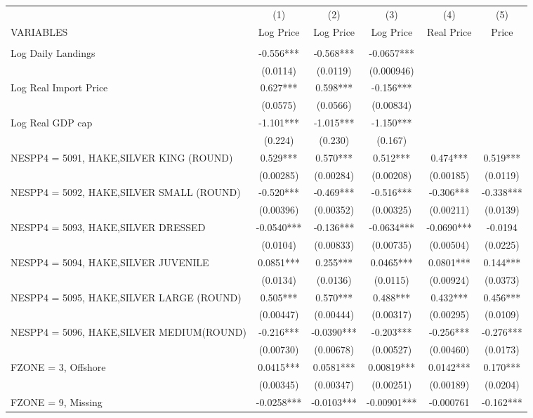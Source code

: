 \begin{tabular}{lccccc} \hline
 & (1) & (2) & (3) & (4) & (5) \\
VARIABLES & Log Price & Log Price & Log Price & Real Price & Price \\ \hline
 &  &  &  &  &  \\
Log Daily Landings & -0.556*** & -0.568*** & -0.0657*** &  &  \\
 & (0.0114) & (0.0119) & (0.000946) &  &  \\
Log Real Import Price & 0.627*** & 0.598*** & -0.156*** &  &  \\
 & (0.0575) & (0.0566) & (0.00834) &  &  \\
Log Real GDP cap & -1.101*** & -1.015*** & -1.150*** &  &  \\
 & (0.224) & (0.230) & (0.167) &  &  \\
NESPP4 = 5091, HAKE,SILVER KING (ROUND) & 0.529*** & 0.570*** & 0.512*** & 0.474*** & 0.519*** \\
 & (0.00285) & (0.00284) & (0.00208) & (0.00185) & (0.0119) \\
NESPP4 = 5092, HAKE,SILVER SMALL (ROUND) & -0.520*** & -0.469*** & -0.516*** & -0.306*** & -0.338*** \\
 & (0.00396) & (0.00352) & (0.00325) & (0.00211) & (0.0139) \\
NESPP4 = 5093, HAKE,SILVER DRESSED & -0.0540*** & -0.136*** & -0.0634*** & -0.0690*** & -0.0194 \\
 & (0.0104) & (0.00833) & (0.00735) & (0.00504) & (0.0225) \\
NESPP4 = 5094, HAKE,SILVER JUVENILE & 0.0851*** & 0.255*** & 0.0465*** & 0.0801*** & 0.144*** \\
 & (0.0134) & (0.0136) & (0.0115) & (0.00924) & (0.0373) \\
NESPP4 = 5095, HAKE,SILVER LARGE (ROUND) & 0.505*** & 0.570*** & 0.488*** & 0.432*** & 0.456*** \\
 & (0.00447) & (0.00444) & (0.00317) & (0.00295) & (0.0109) \\
NESPP4 = 5096, HAKE,SILVER MEDIUM(ROUND) & -0.216*** & -0.0390*** & -0.203*** & -0.256*** & -0.276*** \\
 & (0.00730) & (0.00678) & (0.00527) & (0.00460) & (0.0173) \\
FZONE = 3, Offshore & 0.0415*** & 0.0581*** & 0.00819*** & 0.0142*** & 0.170*** \\
 & (0.00345) & (0.00347) & (0.00251) & (0.00189) & (0.0204) \\
FZONE = 9, Missing & -0.0258*** & -0.0103*** & -0.00901*** & -0.000761 & -0.162*** \\

\end{tabular}
